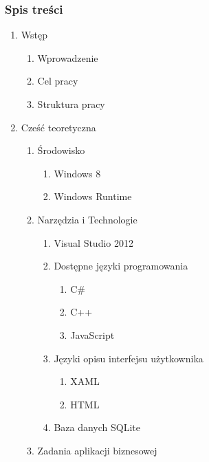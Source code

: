 \begin{frame}
\frametitle{Spis treści}
\begin{enumerate}
\item Wstęp
\begin{enumerate}
\item Wprowadzenie
\item Cel pracy
\item Struktura pracy
\end{enumerate}

\item Cześć teoretyczna

\begin{enumerate}

\item Środowisko
\begin{enumerate}
\item Windows 8
\item Windows Runtime

\end{enumerate}


\item Narzędzia i Technologie
\begin{enumerate}
\item Visual Studio 2012

\item Dostępne języki programowania
\begin{enumerate}
\item C\#
\item C++
\item JavaScript
\end{enumerate}

\item Języki opisu interfejsu użytkownika
\begin{enumerate}
\item XAML
\item HTML
\end{enumerate}
\item Baza danych SQLite
\end{enumerate}

\item Zadania  aplikacji biznesowej
\end{enumerate}
\end{enumerate}

\end{frame}

